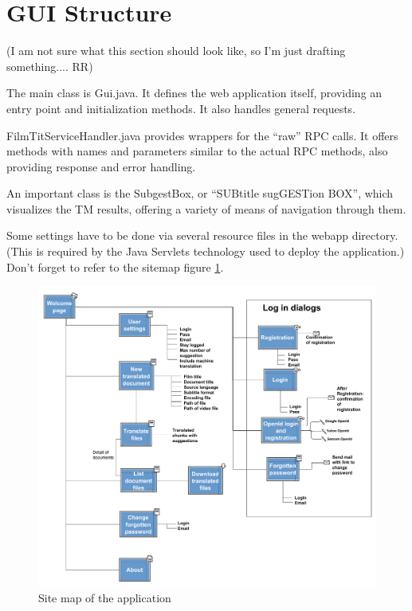\section{GUI Structure}

(I am not sure what this section should look like, so I'm just drafting something.... RR)

The main class is Gui.java. It defines the web application itself, providing an entry point and initialization methods. It also handles general requests.

FilmTitServiceHandler.java provides wrappers for the ``raw'' RPC calls. It offers methods with names and parameters similar to the actual RPC methods, also providing response and error handling.

An important class is the SubgestBox, or ``SUBtitle sugGESTion BOX'', which visualizes the TM results, offering a variety of means of navigation through them.

Some settings have to be done via several resource files in the webapp directory. (This is required by the Java Servlets technology used to deploy the application.) Don't forget to refer to the sitemap figure \ref{fig:sitemap}.

\begin{figure}
\begin{center}
\includegraphics[scale=0.4]{figures/sitemap.pdf}
\end{center}
\caption{Site map of the application}
\label{fig:sitemap}
\end{figure}

